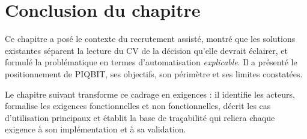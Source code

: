 \section{Conclusion du chapitre}
\label{sec:ctx_conclusion}

Ce chapitre a posé le contexte du recrutement assisté, montré que les
solutions existantes séparent la lecture du CV de la décision qu'elle devrait
éclairer, et formulé la problématique en termes d'automatisation
\emph{explicable}. Il a présenté le positionnement de PIQBIT, ses objectifs,
son périmètre et ses limites constatées.

Le chapitre suivant transforme ce cadrage en exigences : il identifie les
acteurs, formalise les exigences fonctionnelles et non fonctionnelles, décrit
les cas d'utilisation principaux et établit la base de traçabilité qui reliera
chaque exigence à son implémentation et à sa validation.
